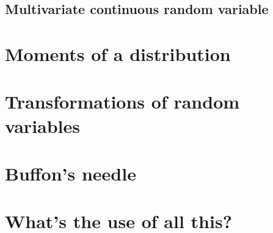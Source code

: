 \begin{refsection}
   \subsection{Multivariate continuous random variable}

   \section{Moments of a distribution}
   \section{Transformations of random variables}
   \section{Buffon's needle}

   \section{What's  the use of all this?}

\printbibliography[heading=subbibliography]
\end{refsection}
